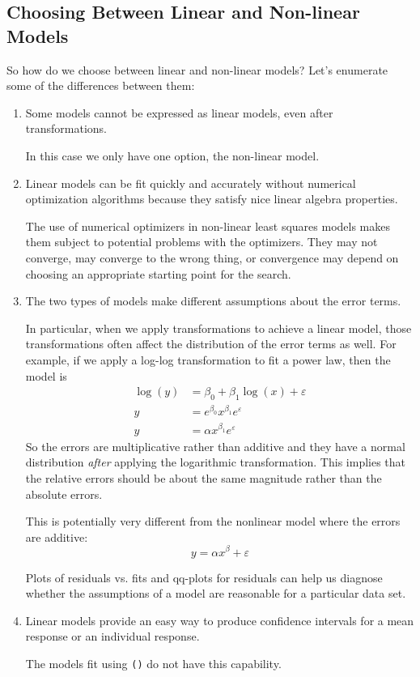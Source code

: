 \documentclass[twoside]{book}\usepackage[]{graphicx}\usepackage[]{xcolor}
\newcommand{\Rindex}[1]{\index{\texttt{#1}}}
\newcommand{\function}[1]{{\color{purple!75!blue}\texttt{\StrSubstitute{#1}{()}{}()}}\Rindex{#1}}
\newcounter{example}[section]
\begin{document}
\subsection{Choosing Between Linear and Non-linear Models}

So how do we choose between linear and non-linear models?  Let's enumerate some
of the differences between them:

\begin{enumerate}
	\item
		Some models cannot be expressed as linear models, even after transformations.

		In this case we only have one option, the non-linear model.

	\item
		Linear models can be fit quickly and accurately without numerical
		optimization algorithms because they satisfy nice linear algebra
		properties.

		The use of numerical optimizers in non-linear least squares models
		makes them subject to potential problems with the optimizers.  They may
		not converge, may converge to the wrong thing, or convergence may depend
		on choosing an appropriate starting point for the search.

	\item
		The two types of models make different assumptions about the error terms.

		In particular, when we apply transformations to achieve a linear model,
		those transformations often affect the distribution of the error terms as 
		well.  For example, if we apply a log-log transformation to fit a power law,
		then the model is
		\begin{align*}
		\log( y ) &= \beta_0 + \beta_1 \log(x) + \varepsilon
		\\
		y &= e^{\beta_0}  x^{\beta_1} e^\varepsilon
		\\
		y &= \alpha  x^{\beta_1} e^\varepsilon
	\end{align*}
	So the errors are multiplicative rather than additive and
	they have a normal distribution \emph{after} applying the logarithmic
	transformation.  This implies that the relative errors should be about
	the same magnitude rather than the absolute errors.
	
	This is potentially very different from the nonlinear
	model where the errors are additive:
	\[
	y = \alpha x^\beta + \varepsilon
	\]

		Plots of residuals vs. fits and qq-plots for residuals can help us diagnose
		whether the assumptions of a model are reasonable for a particular 
		data set.

	\item
		Linear models provide an easy way to produce confidence intervals for 
		a mean response or an individual response.

		The models fit using \function{nls()} do not have this capability.
\end{enumerate}
\end{document}

